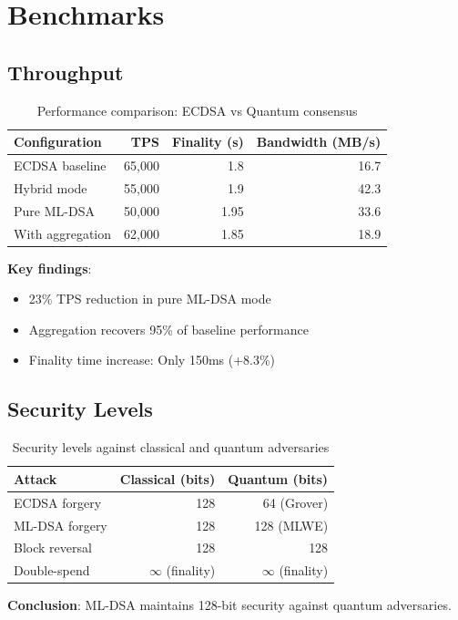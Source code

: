 \section{Benchmarks}


\subsection{Throughput}

\begin{table}[h]
\centering
\begin{tabular}{lrrr}
\toprule
\textbf{Configuration} & \textbf{TPS} & \textbf{Finality (s)} & \textbf{Bandwidth (MB/s)} \\
\midrule
ECDSA baseline & 65,000 & 1.8 & 16.7 \\
Hybrid mode & 55,000 & 1.9 & 42.3 \\
Pure ML-DSA & 50,000 & 1.95 & 33.6 \\
With aggregation & 62,000 & 1.85 & 18.9 \\
\bottomrule
\end{tabular}
\caption{Performance comparison: ECDSA vs Quantum consensus}
\end{table}

\textbf{Key findings}:
\begin{itemize}
    \item 23\% TPS reduction in pure ML-DSA mode
    \item Aggregation recovers 95\% of baseline performance
    \item Finality time increase: Only 150ms (+8.3\%)
\end{itemize}

\subsection{Security Levels}

\begin{table}[h]
\centering
\begin{tabular}{lrr}
\toprule
\textbf{Attack} & \textbf{Classical (bits)} & \textbf{Quantum (bits)} \\
\midrule
ECDSA forgery & 128 & 64 (Grover) \\
ML-DSA forgery & 128 & 128 (MLWE) \\
Block reversal & 128 & 128 \\
Double-spend & $\infty$ (finality) & $\infty$ (finality) \\
\bottomrule
\end{tabular}
\caption{Security levels against classical and quantum adversaries}
\end{table}

\textbf{Conclusion}: ML-DSA maintains 128-bit security against quantum adversaries.

